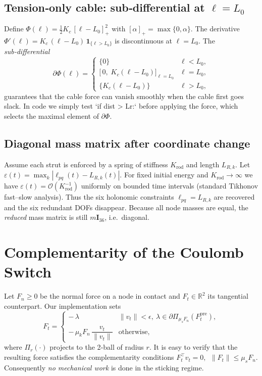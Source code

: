 \documentclass[12pt,letterpaper]{article}
\newcommand{\R}{\mathbb{R}}
\begin{document}
\subsection{Tension‑only cable: sub‑differential at $\ell=L_{0}$}

Define $\Phi(\ell)=\tfrac12K_c\,[\ell-L_0]_+^{2}$ with
$[\alpha]_+=\max\{0,\alpha\}$.
The derivative
\(
    \Phi'(\ell)=
    K_c\,(\ell-L_0)\,\mathbf 1_{\{\ell>L_0\}}
\)
is discontinuous at $\ell=L_0$.  The \emph{sub‑differential}
\[
    \partial\Phi(\ell)=
    \begin{cases}
        \{0\}                                   & \ell<L_0,\\
        \bigl[\,0,\;K_c(\ell-L_0)\bigr]_{\ell=L_0} & \ell=L_0,\\
        \{K_c(\ell-L_0)\}                       & \ell>L_0,
    \end{cases}
\]
guarantees that the cable force can vanish smoothly when the cable first
goes slack.  In code we simply test `if dist > Lr:` before applying the
force, which selects the maximal element of $\partial\Phi$.

\subsection{Diagonal mass matrix after coordinate change}
\label{sec:holonomic-limit}

Assume each strut is enforced by a spring of stiffness $K_{\text{rod}}$
and length $L_{R,k}$.
Let $\varepsilon(t)=\max_k|\ell_{pq}(t)-L_{R,k}(t)|$.
For fixed initial energy and $K_{\text{rod}}\!\to\!\infty$ we have
$\varepsilon(t)=\mathcal O(K_{\text{rod}}^{-1})$ uniformly on bounded
time intervals (standard Tikhonov fast–slow analysis).
Thus the six holonomic constraints $\ell_{pq}=L_{R,k}$ are recovered
and the six redundant DOFs disappear.
Because all node masses are equal, the \emph{reduced} mass matrix is still
$m\mathbf I_{36}$, i.e.\ diagonal.

\section{Complementarity of the Coulomb Switch}
\label{sec:friction-proof}

Let $F_n\ge0$ be the normal force on a node in contact and
$F_t\in\R^2$ its tangential counterpart.
Our implementation sets
\[
    F_t =
    \begin{cases}
      -\,\lambda & \|v_t\|<\epsilon,~
                   \lambda\in\partial\Pi_{\mu_s F_n}(F^{\mathrm{pre}}_t),\\
      -\,\mu_k F_n\,\dfrac{v_t}{\|v_t\|} & \text{otherwise},
    \end{cases}
\]
where $\Pi_{r}( \cdot)$ projects to the 2‑ball of radius $r$.
It is easy to verify that the resulting force satisfies the
complementarity conditions
\(
    F_t^{\top}v_t = 0,~~
    \|F_t\|\le\mu_s F_n.
\)
Consequently \emph{no mechanical work} is done in the sticking regime.
\end{document}
